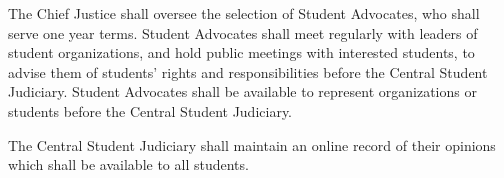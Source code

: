     The Chief Justice shall oversee the selection of  Student Advocates, who shall serve one year terms. Student Advocates shall meet regularly with leaders of student organizations, and hold public meetings with interested students, to advise them of students' rights and responsibilities before the Central Student Judiciary. Student Advocates shall be available to represent organizations or students before the Central Student Judiciary. 

    The Central Student Judiciary shall maintain an online record of their opinions which shall be available to all students.
